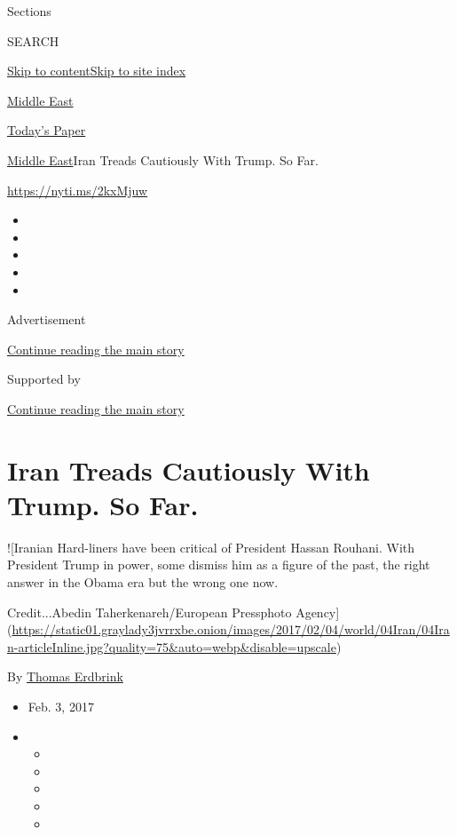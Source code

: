 Sections

SEARCH

\protect\hyperlink{site-content}{Skip to
content}\protect\hyperlink{site-index}{Skip to site index}

\href{https://www.nytimes3xbfgragh.onion/section/world/middleeast}{Middle
East}

\href{https://myaccount.nytimes3xbfgragh.onion/auth/login?response_type=cookie\&client_id=vi}{}

\href{https://www.nytimes3xbfgragh.onion/section/todayspaper}{Today's
Paper}

\href{/section/world/middleeast}{Middle East}\textbar{}Iran Treads
Cautiously With Trump. So Far.

\url{https://nyti.ms/2kxMjuw}

\begin{itemize}
\item
\item
\item
\item
\item
\end{itemize}

Advertisement

\protect\hyperlink{after-top}{Continue reading the main story}

Supported by

\protect\hyperlink{after-sponsor}{Continue reading the main story}

\hypertarget{iran-treads-cautiously-with-trump-so-far}{%
\section{Iran Treads Cautiously With Trump. So
Far.}\label{iran-treads-cautiously-with-trump-so-far}}

!{[}Iranian Hard-liners have been critical of President Hassan Rouhani.
With President Trump in power, some dismiss him as a figure of the past,
the right answer in the Obama era but the wrong one now.

Credit...Abedin Taherkenareh/European Pressphoto
Agency{]}(\url{https://static01.graylady3jvrrxbe.onion/images/2017/02/04/world/04Iran/04Iran-articleInline.jpg?quality=75\&auto=webp\&disable=upscale})

By \href{http://www.nytimes3xbfgragh.onion/by/thomas-erdbrink}{Thomas
Erdbrink}

\begin{itemize}
\item
  Feb. 3, 2017
\item
  \begin{itemize}
  \item
  \item
  \item
  \item
  \item
  \end{itemize}
\end{itemize}


